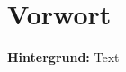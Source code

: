 %
%
\thispagestyle{empty} 
\let\raggedsection\centering 
\chapter*{Vorwort}\label{vorwort}
\let\raggedsection\raggedright 
\textbf{Hintergrund:} Text